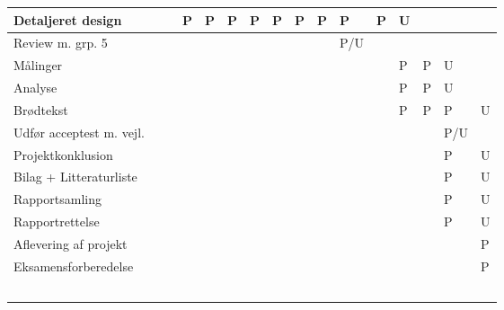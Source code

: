 \documentclass[landscape, 12pt, letterpaper]{article}
\begin{document}
\begin{table}[]
\begin{tabular}{|l|l|l|l|l|l|l|l|l|l|l|l|l|l|l|l|}
Detaljeret design       &    &    &  P &  P &  P & P  &  P & P  & P  &  P & P  & U  &    &    &    \\ \hline
Review m. grp. 5        &    &    &    &    &    &    &    &    &    &P/U &    &    &    &    &    \\ \hline
Målinger                &    &    &    &    &    &    &    &    &    &    &    & P  & P  & U  &    \\ \hline
Analyse                 &    &    &    &    &    &    &    &    &    &    &    &  P & P  & U  &    \\ \hline
Brødtekst               &    &    &    &    &    &    &    &    &    &    &    &  P & P  & P  &  U \\ \hline
Udfør acceptest m. vejl.&    &    &    &    &    &    &    &    &    &    &    &    &    &P/U &    \\ \hline
Projektkonklusion       &    &    &    &    &    &    &    &    &    &    &    &    &    & P  &  U \\ \hline
Bilag + Litteraturliste &    &    &    &    &    &    &    &    &    &    &    &    &    &  P &  U \\ \hline
Rapportsamling          &    &    &    &    &    &    &    &    &    &    &    &    &    &  P &  U \\ \hline
Rapportrettelse         &    &    &    &    &    &    &    &    &    &    &    &    &    &  P &  U \\ \hline
Aflevering af projekt   &    &    &    &    &    &    &    &    &    &    &    &    &    &    &  P \\ \hline
Eksamensforberedelse    &    &    &    &    &    &    &    &    &    &    &    &    &    &    &  P \\ \hline
                        &    &    &    &    &    &    &    &    &    &    &    &    &    &    &    \\ \hline
                        &    &    &    &    &    &    &    &    &    &    &    &    &    &    &    \\ \hline
                        &    &    &    &    &    &    &    &    &    &    &    &    &    &    &    \\ \hline
                        &    &    &    &    &    &    &    &    &    &    &    &    &    &    &    \\ \hline
                        &    &    &    &    &    &    &    &    &    &    &    &    &    &    &    \\ \hline
\end{tabular}
\end{table}
\end{document}
